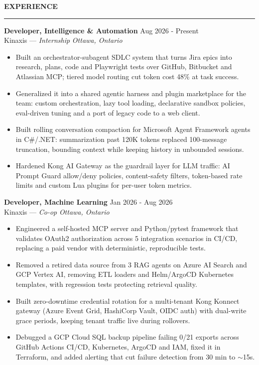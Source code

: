 \documentclass{resume}
\newcommand{\ats}[2]{\BeginAccSupp{method=pdfstringdef,ActualText={#2}}#1\EndAccSupp{}}
\newcommand{\bulletgap}{-3pt}   %
\newcommand{\headergap}{-3pt}   %
\def\sectionskip{\vspace{12pt}}     %
\renewenvironment{rSection}[1]{%
  \sectionskip
  {\large\bfseries\MakeUppercase{#1}}%
  \sectionlineskip
  \hrule
  \begin{list}{}{\setlength{\leftmargin}{0em}}
  \item[]
}{%
  \end{list}
  \vspace{-0.5em}
}
\begin{document}
\begin{rSection}{Experience}


\textbf{Developer, Intelligence \& Automation} \hfill Aug 2026 - Present\\
Kinaxis --- \textit{Internship} \hfill \textit{Ottawa, Ontario}%
\vspace{\headergap}
\begin{itemize}[leftmargin=0.15in]
    \itemsep \bulletgap {}
    \item Built an orchestrator-subagent SDLC system that turns Jira epics into research, plans, code and Playwright tests over GitHub, Bitbucket and Atlassian MCP; tiered model routing cut token cost 48\% at task success.
    \item Generalized it into a shared agentic harness and plugin marketplace for the team: custom orchestration, lazy tool loading, declarative sandbox policies, eval-driven tuning and a port of legacy code to a web client.
    \item Built rolling conversation compaction for Microsoft Agent Framework agents in C\#/.NET: summarization past 120K tokens replaced 100-message truncation, bounding context while keeping history in unbounded sessions.
    \item Hardened Kong AI Gateway as the guardrail layer for LLM traffic: AI Prompt Guard allow/deny policies, content-safety filters, token-based rate limits and custom Lua plugins for per-user token metrics.
\end{itemize}

\textbf{Developer, Machine Learning} \hfill Jan 2026 - Aug 2026\\
Kinaxis --- \textit{Co-op} \hfill \textit{Ottawa, Ontario}%
\vspace{\headergap}
\vspace{\headergap}
\begin{itemize}[leftmargin=0.15in]
    \itemsep \bulletgap {}
    \item Engineered a self-hosted MCP server and Python/pytest framework that validates OAuth2 authorization across 5 integration scenarios in CI/CD, replacing a paid vendor with deterministic, reproducible tests.
    \item Removed a retired data source from 3 RAG agents on Azure AI Search and GCP Vertex AI, removing ETL loaders and Helm/ArgoCD Kubernetes templates, with regression tests protecting retrieval quality.
    \item Built zero-downtime credential rotation for a multi-tenant Kong Konnect gateway (Azure Event Grid, HashiCorp Vault, OIDC auth) with dual-write grace periods, keeping tenant traffic live during rollovers.
    \item Debugged a GCP Cloud SQL backup pipeline failing 0/21 exports across GitHub Actions CI/CD, Kubernetes, ArgoCD and IAM, fixed it in Terraform, and added alerting that cut failure detection from 30 min to \ats{$\sim$}{\textasciitilde}15s.
\end{itemize}


\end{rSection}
\end{document}
